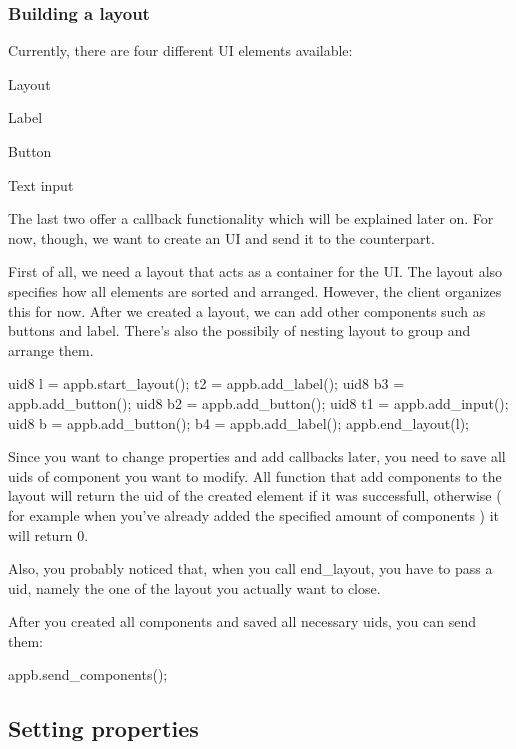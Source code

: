 \subsubsection*{Building a layout}

Currently, there are four different U\+I elements available\+:
\begin{DoxyItemize}
\item Layout
\item Label
\item Button
\item Text input
\end{DoxyItemize}

The last two offer a callback functionality which will be explained later on. For now, though, we want to create an U\+I and send it to the counterpart.

First of all, we need a layout that acts as a container for the U\+I. The layout also specifies how all elements are sorted and arranged. However, the client organizes this for now. After we created a layout, we can add other components such as buttons and label. There's also the possibily of nesting layout to group and arrange them.


\begin{DoxyCode}
uid8 l = appb.start\_layout();
t2 = appb.add\_label();
uid8 b3 = appb.add\_button();
uid8 b2 = appb.add\_button();
uid8 t1 = appb.add\_input();
uid8 b = appb.add\_button();
b4 = appb.add\_label();
appb.end\_layout(l);
\end{DoxyCode}


Since you want to change properties and add callbacks later, you need to save all uids of component you want to modify. All function that add components to the layout will return the uid of the created element if it was successfull, otherwise ( for example when you've already added the specified amount of components ) it will return 0.

Also, you probably noticed that, when you call {\ttfamily end\+\_\+layout}, you have to pass a uid, namely the one of the layout you actually want to close.

After you created all components and saved all necessary uids, you can send them\+:


\begin{DoxyCode}
appb.send\_components();
\end{DoxyCode}


\subsection*{Setting properties}

